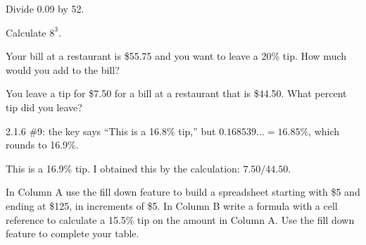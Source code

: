\begin{stmt}
Divide 0.09 by 52.
\end{stmt}

\begin{sol}

\end{sol}


\begin{stmt}
Calculate $8^3$.
\end{stmt}

\begin{sol}

\end{sol}


\begin{stmt}
Your bill at a restaurant is \$55.75 and you want to leave a 20\% tip. How much would you add to the bill?
\end{stmt}

\begin{sol}

\end{sol}


\begin{stmt}
You leave a tip for \$7.50 for a bill at a restaurant that is \$44.50. What percent tip did you leave?
\end{stmt}

\begin{sol}


\begin{corr}{2.1.6 \#9: the key says ``This is a 16.8\% tip,'' but $0.168539\ldots = 16.85\%$, which rounds to 16.9\%.}%
\end{corr}

This is a 16.9\% tip. I obtained this by the calculation: $7.50/44.50$.
\end{sol}


\begin{stmt}
In Column A use the fill down feature to build a spreadsheet starting with \$5 and ending at \$125, in increments of \$5. In Column B write a formula with a cell reference to calculate a 15.5\% tip on the amount in Column A. Use the fill down feature to complete your table.
\end{stmt}

